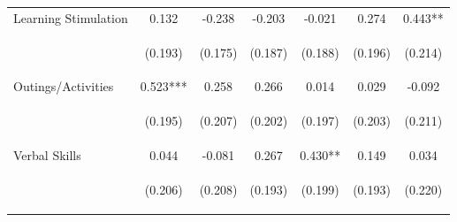 \begin{tabular}{lcccccc}
\noalign{\smallskip}Learning Stimulation & 0.132 & -0.238 & -0.203 & -0.021 & 0.274 & 0.443**\\
 & \begin{footnotesize}(0.193)\end{footnotesize} & \begin{footnotesize}(0.175)\end{footnotesize} & \begin{footnotesize}(0.187)\end{footnotesize} & \begin{footnotesize}(0.188)\end{footnotesize} & \begin{footnotesize}(0.196)\end{footnotesize} & \begin{footnotesize}(0.214)\end{footnotesize}\\
\noalign{\smallskip}Outings/Activities & 0.523*** & 0.258 & 0.266 & 0.014 & 0.029 & -0.092\\
 & \begin{footnotesize}(0.195)\end{footnotesize} & \begin{footnotesize}(0.207)\end{footnotesize} & \begin{footnotesize}(0.202)\end{footnotesize} & \begin{footnotesize}(0.197)\end{footnotesize} & \begin{footnotesize}(0.203)\end{footnotesize} & \begin{footnotesize}(0.211)\end{footnotesize}\\
\noalign{\smallskip}Verbal Skills & 0.044 & -0.081 & 0.267 & 0.430** & 0.149 & 0.034\\
 & \begin{footnotesize}(0.206)\end{footnotesize} & \begin{footnotesize}(0.208)\end{footnotesize} & \begin{footnotesize}(0.193)\end{footnotesize} & \begin{footnotesize}(0.199)\end{footnotesize} & \begin{footnotesize}(0.193)\end{footnotesize} & \begin{footnotesize}(0.220)\end{footnotesize}\\

\end{tabular}
